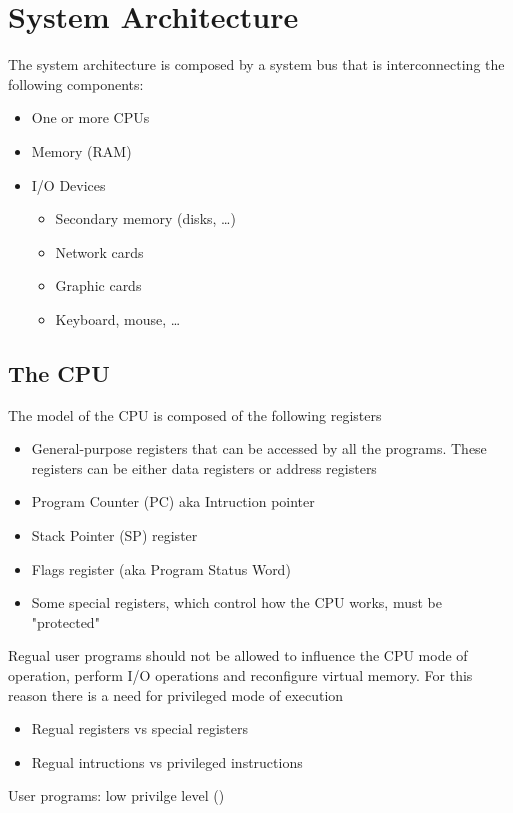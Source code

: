\section{System Architecture}
The system architecture is composed by a system bus that is interconnecting the following components:
\begin{itemize}
    \item One or more CPUs
    \item Memory (RAM)
    \item I/O Devices
    \begin{itemize}
        \item Secondary memory (disks, \dots)
        \item Network cards
        \item Graphic cards
        \item Keyboard, mouse, \dots
    \end{itemize}
\end{itemize}

\subsection{The CPU}
The model of the CPU is composed of the following registers
\begin{itemize}
    \item General-purpose registers that can be accessed by all the programs. These registers can be either data registers or address registers
    \item Program Counter (PC) aka Intruction pointer
    \item Stack Pointer (SP) register
    \item Flags register (aka Program Status Word)
    \item Some special registers, which control how the CPU works, must be "protected" 
\end{itemize}

Regual user programs should not be allowed to influence the CPU mode of operation, perform I/O operations and reconfigure virtual memory. For this reason there is a need for privileged mode of execution
\begin{itemize}
\item Regual registers vs special registers
\item Regual intructions vs privileged instructions
\end{itemize}
User programs: low privilge level ()

